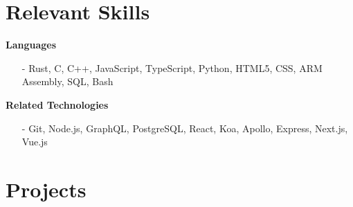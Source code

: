 \documentclass[margin,line]{res}
\begin{document}
\begin{resume}
\section{\sc Relevant Skills}
  {\bf Languages}
  \begin{itemize} \itemsep -2pt
    \item[-] Rust, C, C++, JavaScript, TypeScript, Python, HTML5, CSS, ARM Assembly, SQL, Bash
  \end{itemize}
  {\bf Related Technologies}
  \begin{itemize} \itemsep -2pt
    \item[-] Git, Node.js, GraphQL, PostgreSQL, React, Koa, Apollo, Express, Next.js, Vue.js
  \end{itemize}

\section{\sc Projects}


\end{resume}
\end{document}
